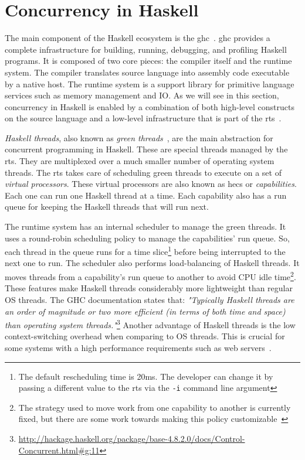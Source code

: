 \section{Concurrency in Haskell}\label{sec:haskell-conc}
The main component of the Haskell ecosystem is the \ac{ghc}~\cite{smpj:1993}. \acs{ghc} provides a complete infrastructure for building, running, debugging, and profiling Haskell programs. It is composed of two core pieces: the compiler itself and the runtime system. The compiler translates source language into assembly code executable by a native host. The runtime system is a support library for primitive language services such as memory management and IO. As we will see in this section, concurrency in Haskell is enabled by a combination of both high-level constructs on the source language and a low-level infrastructure that is part of the \ac{rts}~\cite{li:2007}.

\emph{Haskell threads}, also known as \emph{green threads}~\cite{marlow:2011}, are the main abstraction for concurrent programming in Haskell. These are special threads managed by the \acl{rts}. They are multiplexed over a much smaller number of operating system threads. The \ac{rts} takes care of scheduling green threads to execute on a set of \emph{virtual processors}. These virtual processors are also known as \acp{hec} or \emph{capabilities}. Each one can run one Haskell thread at a time. Each capability also has a run queue for keeping the Haskell threads that will run next.

The runtime system has an internal scheduler to manage the green threads. It uses a round-robin scheduling policy to manage the capabilities' run queue. So, each thread in the queue runs for a time slice\footnote{The default rescheduling time is 20ms. The developer can change it by passing a different value to the \ac{rts} via the \texttt{-i} command line argument} before being interrupted to the next one to run. The scheduler also performs load-balancing of Haskell threads. It moves threads from a capability's run queue to another to avoid CPU idle time\footnote{The strategy used to move work from one capability to another is currently fixed, but there are some work towards making this policy customizable~\cite{siva:2014}}. These features make Haskell threads considerably more lightweight than regular OS threads. The GHC documentation states that: \emph{"Typically Haskell threads are an order of magnitude or two more efficient (in terms of both time and space) than operating system threads."}\footnote{\url{http://hackage.haskell.org/package/base-4.8.2.0/docs/Control-Concurrent.html\#g:11}} Another advantage of Haskell threads is the low context-switching overhead when comparing to OS threads. This is crucial for some systems with a high performance requirements such as web servers~\cite{voellmy:2013}.

